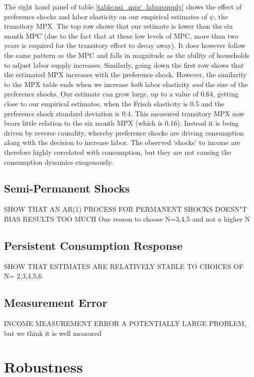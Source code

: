 \documentclass[titlepage]{\econtex}\newcommand{\texname}{ConsumptionHeterogeneity}
\begin{document}
The right hand panel of table \ref{table:psi_mpc_laborsupply} shows the effect of preference shocks and labor elasticity on our empirical estimates of $\psi$, the transitory MPX. The top row shows that our estimate is lower than the six month MPC (due to the fact that at these low levels of MPC, more than two years is required for the transitory effect to decay away). It does however follow the same pattern as the MPC and falls in magnitude as the ability of households to adjust labor supply increases. Similarly, going down the first row shows that the estimated MPX increases with the preference shock. However, the similarity to the MPX table ends when we increase \textit{both} labor elasticity \textit{and} the size of the preference shocks. Our estimate can grow large, up to a value of 0.64, getting close to our empirical estimates, when the Frisch elasticity is 0.5 and the preference shock standard deviation is 0.4. This measured transitory MPX now bears little relation to the six month MPX (which is 0.16). Instead it is being driven by reverse causality, whereby preference shocks are driving consumption along with the decision to increase labor. The observed `shocks' to income are therefore highly correlated with consumption, but they are not causing the consumption dynamics exogenously.

\subsection{Semi-Permanent Shocks}

SHOW THAT AN AR(1) PROCESS FOR PERMANENT SHOCKS DOESN"T BIAS RESULTS TOO MUCH
One reason to choose N=3,4,5 and not a higher N

\subsection{Persistent Consumption Response} \label{Consumption_persistence}
SHOW THAT ESTIMATES ARE RELATIVELY STABLE TO CHOICES OF N= 2,3,4,5,6

\subsection{Measurement Error}
INCOME MEASUREMENT ERROR A POTENTIALLY LARGE PROBLEM, but we think it is well measured

\section{Robustness} \label{robustness}
\end{document}
